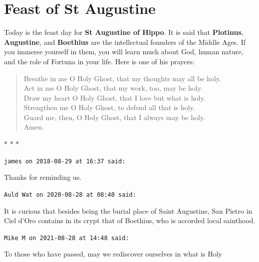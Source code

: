 \section{Feast of St Augustine}

Today is the feast day for \textbf{St Augustine of Hippo}. It is said that \textbf{Plotinus}, \textbf{Augustine}, and \textbf{Boethius} are the intellectual founders of the Middle Ages. If you immerse yourself in them, you will learn much about God, human nature, and the role of Fortuna in your life. Here is one of his prayers:

\begin{verse}
Breathe in me O Holy Ghost, that my thoughts may all be holy.\\
Act in me O Holy Ghost, that my work, too, may be holy.\\
Draw my heart O Holy Ghost, that I love but what is holy.\\
Strengthen me O Holy Ghost, to defend all that is holy.\\
Guard me, then, O Holy Ghost, that I always may be holy.\\
Amen.
\end{verse}




\begin{center}* * *\end{center}

\begin{footnotesize}
\begin{sffamily}
\texttt{james on 2018-08-29 at 16:37 said:}

Thanks for reminding us.

\hfill

\texttt{Auld Wat on 2020-08-28 at 08:40 said:}

It is curious that besides being the burial place of Saint Augustine, San Pietro in Ciel d'Oro contains in its crypt that of Boethius, who is accorded local sainthood.

\hfill

\texttt{Mike M on 2021-08-28 at 14:48 said:}

To those who have passed, may we rediscover ourselves in what is Holy

\hfill

\end{sffamily}
\end{footnotesize}

